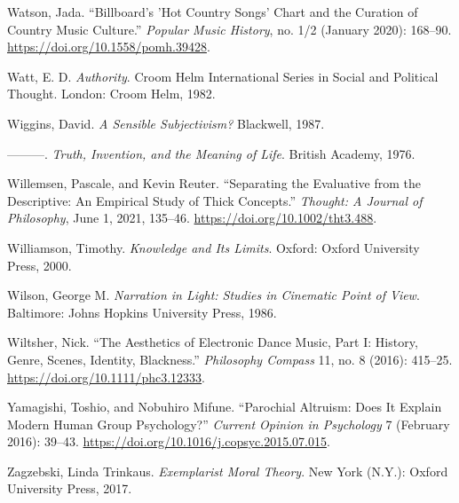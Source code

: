 \documentclass[phdthesis,12pt,final]{wuthesis}
\newlength{\cslhangindent}
\newenvironment{CSLReferences}[2] %
{\begin{list}{}{%
	\setlength{\itemindent}{0pt}
	\setlength{\leftmargin}{0pt}
	\setlength{\parsep}{0pt}
	\ifodd #1
	\setlength{\leftmargin}{\cslhangindent}
	\setlength{\itemindent}{-1\cslhangindent}
	\fi
	\setlength{\itemsep}{#2\baselineskip}}}
{\end{list}}
\theoremstyle{definition}
\theoremstyle{definition}
\theoremstyle{definition}
\theoremstyle{definition}
\theoremstyle{remark}
\begin{document}
\begin{CSLReferences}{1}{0}
Watson, Jada. {``Billboard's '{Hot Country Songs}' Chart and the Curation of Country Music Culture.''} \emph{Popular Music History}, no. 1/2 (January 2020): 168--90. \url{https://doi.org/10.1558/pomh.39428}.

Watt, E. D. \emph{Authority}. Croom {Helm} International Series in Social and Political Thought. London: Croom Helm, 1982.

Wiggins, David. \emph{A {Sensible Subjectivism}?} Blackwell, 1987.

---------. \emph{Truth, {Invention}, and the {Meaning} of {Life}}. British Academy, 1976.

Willemsen, Pascale, and Kevin Reuter. {``Separating the Evaluative from the Descriptive: {An} Empirical Study of Thick Concepts.''} \emph{Thought: A Journal of Philosophy}, June 1, 2021, 135--46. \url{https://doi.org/10.1002/tht3.488}.

Williamson, Timothy. \emph{Knowledge and {Its Limits}}. Oxford: Oxford University Press, 2000.

Wilson, George M. \emph{Narration in Light: Studies in Cinematic Point of View}. Baltimore: Johns Hopkins University Press, 1986.

Wiltsher, Nick. {``The {Aesthetics} of {Electronic Dance Music}, {Part I}: {History}, {Genre}, {Scenes}, {Identity}, {Blackness}.''} \emph{Philosophy Compass} 11, no. 8 (2016): 415--25. \url{https://doi.org/10.1111/phc3.12333}.

Yamagishi, Toshio, and Nobuhiro Mifune. {``Parochial {Altruism}: {Does It Explain Modern Human Group Psychology}?''} \emph{Current Opinion in Psychology} 7 (February 2016): 39--43. \url{https://doi.org/10.1016/j.copsyc.2015.07.015}.

Zagzebski, Linda Trinkaus. \emph{Exemplarist {Moral Theory}}. New York (N.Y.): Oxford University Press, 2017.

\end{CSLReferences}

\backmatter

\cleardoublepage
{}
{}
\end{document}
